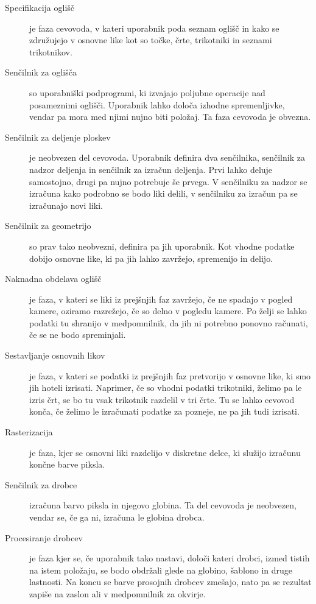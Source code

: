\documentclass[a4paper, 12pt]{book}
\begin{document}
\begin{description}
\item [Specifikacija oglišč] je faza cevovoda, v kateri uporabnik poda seznam oglišč in kako se združujejo v osnovne like kot so točke, črte, trikotniki in seznami trikotnikov.
\item [Senčilnik za oglišča] so uporabniški podprogrami, ki izvajajo poljubne operacije nad posameznimi oglišči. Uporabnik lahko določa izhodne spremenljivke, vendar pa mora med njimi nujno biti položaj. Ta faza cevovoda je obvezna.
\item [Senčilnik za deljenje ploskev] je neobvezen del cevovoda. Uporabnik definira dva senčilnika, senčilnik za nadzor deljenja in senčilnik za izračun deljenja. Prvi lahko deluje samostojno, drugi pa nujno potrebuje še prvega. V senčilniku za nadzor se izračuna kako podrobno se bodo liki delili, v senčilniku za izračun pa se izračunajo novi liki.

\item [Senčilnik za geometrijo] so prav tako neobvezni, definira pa jih uporabnik. Kot vhodne podatke dobijo osnovne like, ki pa jih lahko zavržejo, spremenijo in delijo.

\item [Naknadna obdelava oglišč] je faza, v kateri se liki iz prejšnjih faz zavržejo, če ne spadajo v pogled kamere, oziramo razrežejo, če so delno v pogledu kamere. Po želji se lahko podatki tu shranijo v medpomnilnik, da jih ni potrebno ponovno računati, če se ne bodo spreminjali.
\item [Sestavljanje osnovnih likov] je faza, v kateri se podatki iz prejšnjih faz pretvorijo v osnovne like, ki smo jih hoteli izrisati. Naprimer, če so vhodni podatki trikotniki, želimo pa le izris črt, se bo tu vsak trikotnik razdelil v tri črte. Tu se lahko cevovod konča, če želimo le izračunati podatke za pozneje, ne pa jih tudi izrisati. 
\item [Rasterizacija] je faza, kjer se osnovni liki razdelijo v diskretne delce, ki služijo izračunu končne barve piksla.
\item [Senčilnik za drobce]izračuna barvo piksla in njegovo globina. Ta del cevovoda je neobvezen, vendar se, če ga ni, izračuna le globina drobca.
\item [Procesiranje drobcev] je faza kjer se, če uporabnik tako nastavi, določi kateri drobci, izmed tistih na istem položaju, se bodo obdržali glede na globino, šablono in druge lastnosti. Na koncu se barve prosojnih drobcev zmešajo, nato pa se rezultat zapiše na zaslon ali v medpomnilnik za okvirje.
\end{description}
\end{document}
